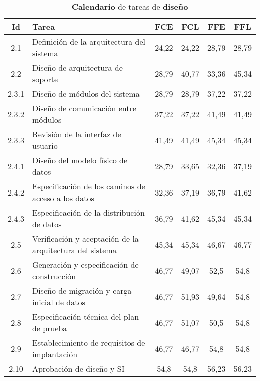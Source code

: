 \documentclass[11pt,a4paper,spanish,twoside]{report}
\begin{document}
\begin{table}[!h]
  \centering
  \begin{tabular}{|c||p{5.3cm}||c|c|c|c|}
    \hline
    \textbf{Id} & \textbf{Tarea} & \textbf{FCE} & \textbf{FCL} &
    \textbf{FFE} & \textbf{FFL}\\
    \hline \hline
    2.1 & Definición de la arquitectura del sistema & 24,22 & 24,22 & 28,79
    & 28,79 \\ 
    \hline
    2.2 & Diseño de arquitectura de soporte & 28,79 & 40,77 & 33,36 & 45,34 \\
    \hline
    2.3.1 & Diseño de módulos del sistema  & 28,79 & 28,79 & 37,22 & 37,22 \\
    \hline
    2.3.2 & Diseño de comunicación entre módulos & 37,22 & 37,22 & 41,49  &
    41,49  \\ 
    \hline
    2.3.3 & Revisión de la interfaz de usuario  & 41,49 & 41,49 & 45,34 &
    45,34 \\ 
    \hline
    2.4.1 & Diseño del modelo físico de datos  & 28,79 & 33,65 & 32,36 &
    37,19 \\ 
    \hline
    2.4.2 & Especificación de los caminos de acceso a los datos & 32,36
    &37,19  & 36,79  & 41,62 \\ 
    \hline
    2.4.3 & Especificación de la distribución de datos  & 36,79 & 41,62
    &45,34  & 45,34 \\ 
    \hline
    2.5 & Verificación y aceptación de la arquitectura del sistema & 45,34
    & 45,34 & 46,67 & 46,77 \\ 
    \hline
    2.6 & Generación y especificación de construcción & 46,77 & 49,07 &
    52,5 & 54,8 \\ 
    \hline
    2.7 & Diseño de migración y carga inicial de datos & 46,77 & 51,93 &
    49,64 & 54,8 \\ 
    \hline
    2.8 & Especificación técnica del plan de prueba & 46,77 & 51,07 & 50,5
    & 54,8 \\ 
    \hline
    2.9 & Establecimiento de requisitos de implantación & 46,77 & 46,77
    &54,8 & 54,8 \\ 
    \hline
    2.10 & Aprobación de diseño y SI & 54,8 & 54,8 & 56,23 & 56,23\\
    \hline
  \end{tabular}
  \caption{\textbf{Calendario} de tareas de \textbf{diseño}}
  \label{Tab:CALdis}
\end{table}
    
\end{document}
